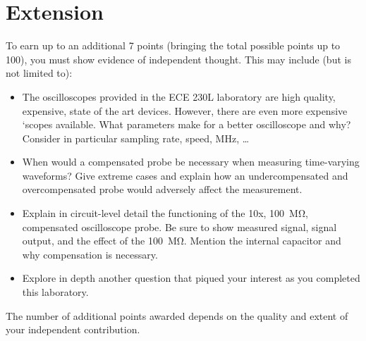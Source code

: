 \documentclass[12pt]{../manual}
\begin{document}
\section{Extension}
To earn up to an additional 7 points (bringing the total possible points up to 100), you must show evidence of independent thought. This may include (but is not limited to):
\begin{itemize}
\item The oscilloscopes provided in the ECE 230L laboratory are high quality, expensive, state of the art devices.  However, there are even more expensive ‘scopes available.  What parameters make for a better oscilloscope and why?  Consider in particular sampling rate, speed, MHz, …
\item When would a compensated probe be necessary when measuring time-varying waveforms?  Give extreme cases and explain how an undercompensated and overcompensated probe would adversely affect the measurement.
\item Explain in circuit-level detail the functioning of the 10x, \SI{100}{\mega\ohm}, compensated oscilloscope probe.  Be sure to show measured signal, signal output, and the effect of the \SI{100}{\mega\ohm}.  Mention the internal capacitor and why compensation is necessary.
\item Explore in depth another question that piqued your interest as you completed this laboratory.
\end{itemize}
The number of additional points awarded depends on the quality and extent of your independent contribution.
\end{document}
